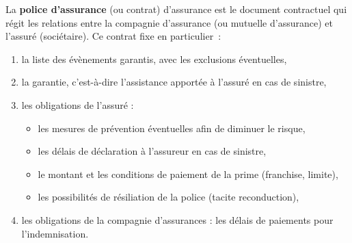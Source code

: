 \begin{f}
	
	La \textbf{police d'assurance} (ou contrat) d'assurance est le document contractuel qui régit les relations entre la compagnie d'assurance (ou mutuelle d'assurance) et l'assuré (sociétaire). 
	Ce contrat fixe en particulier~:
	
	\begin{enumerate}
		\item  la liste des évènements garantis, avec les exclusions éventuelles,
		\item  la garantie, c'est-à-dire l'assistance apportée à l'assuré en cas de sinistre,
		\item  les obligations de l'assuré :
		\begin{itemize}
			\item les mesures de prévention éventuelles afin de diminuer le risque,
			\item les délais de déclaration à l'assureur en cas de sinistre,
			\item le montant et les conditions de paiement de la prime (franchise, limite),
			\item les possibilités de résiliation de la police (tacite reconduction),
		\end{itemize}
		\item  les obligations de la compagnie d'assurances : les délais de paiements pour l'indemnisation.
		
	\end{enumerate}
	
\end{f}
